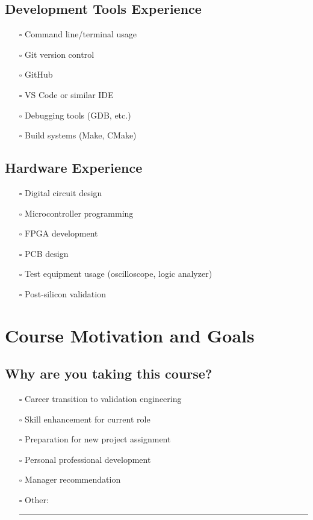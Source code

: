 \documentclass[11pt,a4paper]{article}
\begin{document}
\subsection{Development Tools Experience}
\begin{itemize}[leftmargin=0.5cm]
    \item[$\square$] Command line/terminal usage
    \item[$\square$] Git version control
    \item[$\square$] GitHub
    \item[$\square$] VS Code or similar IDE
    \item[$\square$] Debugging tools (GDB, etc.)
    \item[$\square$] Build systems (Make, CMake)
\end{itemize}

\subsection{Hardware Experience}
\begin{itemize}[leftmargin=0.5cm]
    \item[$\square$] Digital circuit design
    \item[$\square$] Microcontroller programming
    \item[$\square$] FPGA development
    \item[$\square$] PCB design
    \item[$\square$] Test equipment usage (oscilloscope, logic analyzer)
    \item[$\square$] Post-silicon validation
\end{itemize}

\section{Course Motivation and Goals}

\subsection{Why are you taking this course?}
\begin{itemize}[leftmargin=0.5cm]
    \item[$\square$] Career transition to validation engineering
    \item[$\square$] Skill enhancement for current role
    \item[$\square$] Preparation for new project assignment
    \item[$\square$] Personal professional development
    \item[$\square$] Manager recommendation
    \item[$\square$] Other: \rule{5cm}{0.4pt}
\end{itemize}
\end{document}
